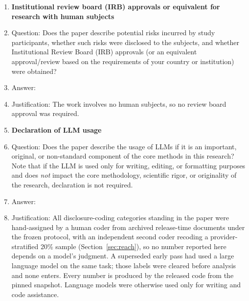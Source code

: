 \begin{enumerate}
\item {\bf Institutional review board (IRB) approvals or equivalent for research with human subjects}
    \item[] Question: Does the paper describe potential risks incurred by study participants, whether such risks were disclosed to the subjects, and whether Institutional Review Board (IRB) approvals (or an equivalent approval/review based on the requirements of your country or institution) were obtained?
    \item[] Answer: \answerNA{}
    \item[] Justification: The work involves no human subjects, so no review board approval was required.


\item {\bf Declaration of LLM usage}
    \item[] Question: Does the paper describe the usage of LLMs if it is an important, original, or non-standard component of the core methods in this research? Note that if the LLM is used only for writing, editing, or formatting purposes and does \emph{not} impact the core methodology, scientific rigor, or originality of the research, declaration is not required.
    \item[] Answer: \answerYes{}
    \item[] Justification: All disclosure-coding categories standing in the paper were hand-assigned by a human coder from archived release-time documents under the frozen protocol, with an independent second coder recoding a provider-stratified 20\% sample (Section~\ref{sec:reach}), so no number reported here depends on a model's judgment. A superseded early pass had used a large language model on the same task; those labels were cleared before analysis and none enters. Every number is produced by the released code from the pinned snapshot. Language models were otherwise used only for writing and code assistance.


\end{enumerate}
